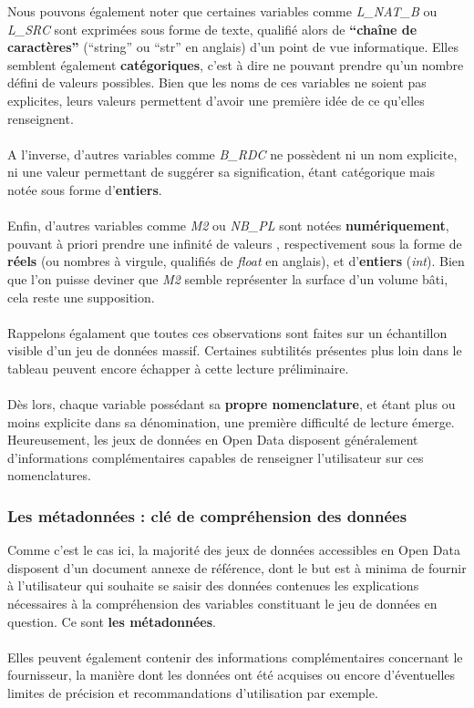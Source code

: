 \documentclass[
  11pt,
  french,
]{article}
\begin{document}
\hfill\break
Nous pouvons également noter que certaines variables comme
\emph{L\_NAT\_B} ou \emph{L\_SRC} sont exprimées sous forme de texte,
qualifié alors de \textbf{``chaîne de caractères''} (``string'' ou
``str'' en anglais) d'un point de vue informatique. Elles semblent
également \textbf{catégoriques}, c'est à dire ne pouvant prendre qu'un
nombre défini de valeurs possibles. Bien que les noms de ces variables
ne soient pas explicites, leurs valeurs permettent d'avoir une première
idée de ce qu'elles renseignent.\\
~\\
A l'inverse, d'autres variables comme \emph{B\_RDC} ne possèdent ni un
nom explicite, ni une valeur permettant de suggérer sa signification,
étant catégorique mais notée sous forme d'\textbf{entiers}.\\
~\\
Enfin, d'autres variables comme \emph{M2} ou \emph{NB\_PL} sont notées
\textbf{numériquement}, pouvant à priori prendre une infinité de valeurs
, respectivement sous la forme de \textbf{réels} (ou nombres à virgule,
qualifiés de \emph{float} en anglais), et d'\textbf{entiers}
(\emph{int}). Bien que l'on puisse deviner que \emph{M2} semble
représenter la surface d'un volume bâti, cela reste une supposition.\\
~\\
Rappelons égalament que toutes ces observations sont faites sur un
échantillon visible d'un jeu de données massif. Certaines subtilités
présentes plus loin dans le tableau peuvent encore échapper à cette
lecture préliminaire.\\
~\\
Dès lors, chaque variable possédant sa \textbf{propre nomenclature}, et
étant plus ou moins explicite dans sa dénomination, une première
difficulté de lecture émerge. Heureusement, les jeux de données en Open
Data disposent généralement d'informations complémentaires capables de
renseigner l'utilisateur sur ces nomenclatures.\\

\hypertarget{les-muxe9tadonnuxe9es-cluxe9-de-compruxe9hension-des-donnuxe9es}{%
\subsubsection{Les métadonnées : clé de compréhension des
données}\label{les-muxe9tadonnuxe9es-cluxe9-de-compruxe9hension-des-donnuxe9es}}

Comme c'est le cas ici, la majorité des jeux de données accessibles en
Open Data disposent d'un document annexe de référence, dont le but est à
minima de fournir à l'utilisateur qui souhaite se saisir des données
contenues les explications nécessaires à la compréhension des variables
constituant le jeu de données en question. Ce sont \textbf{les
métadonnées}.\\
~\\
Elles peuvent également contenir des informations complémentaires
concernant le fournisseur, la manière dont les données ont été acquises
ou encore d'éventuelles limites de précision et recommandations
d'utilisation par exemple.\\
\end{document}
